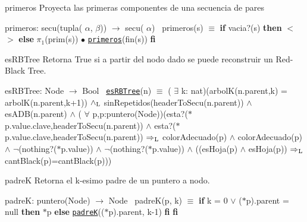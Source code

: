 \begin{DoxyParagraph}{primeros}
Proyecta las primeras componentes de una secuencia de pares

primeros\+: secu(tupla( $\alpha$, $\beta$)) $\to$ secu( $\alpha$)~\newline
 primeros(s) $\equiv$ {\bfseries if} vacia?(s) {\bfseries then} $<$$>$ {\bfseries else} $\pi_1$(prim(s)) $\bullet$ \href{axiomas.html#primeros}{\tt primeros}(fin(s)) {\bfseries fi} 
\end{DoxyParagraph}


\begin{DoxyParagraph}{es\+R\+B\+Tree}
Retorna True si a partir del nodo dado se puede reconstruir un Red-\/\+Black Tree.

es\+R\+B\+Tree\+: Node $\to$ Bool~\newline
 \href{axiomas.html#esRBTree}{\tt es\+R\+B\+Tree}(n) $\equiv$ ( $\exists$ k\+: nat)(arbolK(n.\+parent,k) = arbolK(n.\+parent,k+1)) $\land_{\rm L}$ sin\+Repetidos(header\+To\+Secu(n.\+parent)) $\land$ es\+A\+DB(n.\+parent) $\land$ ( $\forall$ p,p\textquotesingle{}\+:puntero(\+Node))(esta?($\ast$p.value.\+clave,header\+To\+Secu(n.\+parent)) $\land$ esta?($\ast$p\textquotesingle{}.value.\+clave,header\+To\+Secu(n.\+parent)) $\Rightarrow_{\rm L}$ color\+Adecuado(p) $\land$ color\+Adecuado(p\textquotesingle{}) $\land$ $\lnot$(nothing?($\ast$p.value)) $\land$ $\lnot$(nothing?($\ast$p\textquotesingle{}.value)) $\land$ ((es\+Hoja(p) $\land$ es\+Hoja(p\textquotesingle{})) $\Rightarrow_{\rm L}$ cant\+Black(p)=cant\+Black(p\textquotesingle{})))


\end{DoxyParagraph}
\begin{DoxyParagraph}{padreK}
Retorna el k-\/esimo padre de un puntero a nodo.

padreK\+: puntero(\+Node) $\to$ Node~\newline
 padre\+K(p, k) $\equiv$ {\bfseries if} k = 0 $\lor$ ($\ast$p).parent = null {\bfseries then} $\ast$p {\bfseries else} \href{axiomas.html#padreK}{\tt padreK}(($\ast$p).parent, k-\/1) {\bfseries fi} {\bfseries fi} 
\end{DoxyParagraph}
